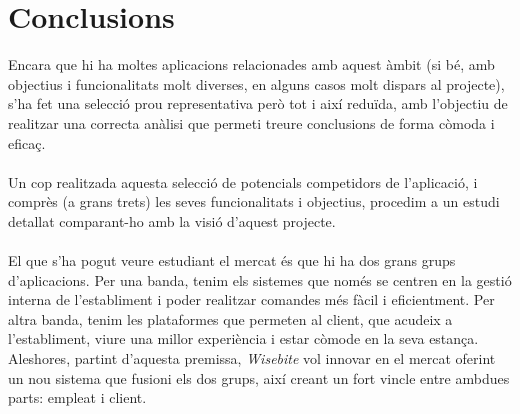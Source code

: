 
\section{Conclusions}

Encara que hi ha moltes aplicacions relacionades amb aquest àmbit (si bé, amb objectius i funcionalitats molt diverses, en alguns casos molt dispars al projecte), s'ha fet una selecció prou representativa però tot i així reduïda, amb l'objectiu de realitzar una correcta anàlisi que permeti treure conclusions de forma còmoda i eficaç.
\\\\
Un cop realitzada aquesta selecció de potencials competidors de l'aplicació, i comprès (a grans trets) les seves funcionalitats i objectius, procedim a un estudi detallat comparant-ho amb la visió d'aquest projecte.
\\\\
El que s'ha pogut veure estudiant el mercat és que hi ha dos grans grups d'aplicacions. Per una banda, tenim els sistemes que només se centren en la gestió interna de l'establiment i poder realitzar comandes més fàcil i eficientment. Per altra banda, tenim les plataformes que permeten al client, que acudeix a l'establiment, viure una millor experiència i estar còmode en la seva estança. Aleshores, partint d'aquesta premissa, \textit{Wisebite} vol innovar en el mercat oferint un nou sistema que fusioni els dos grups, així creant un fort vincle entre ambdues parts: empleat i client.